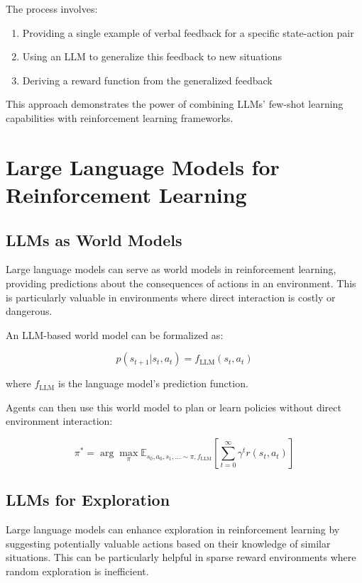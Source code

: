 \documentclass{article}
\begin{document}
The process involves:
\begin{enumerate}
    \item Providing a single example of verbal feedback for a specific state-action pair
    \item Using an LLM to generalize this feedback to new situations
    \item Deriving a reward function from the generalized feedback
\end{enumerate}

This approach demonstrates the power of combining LLMs' few-shot learning capabilities with reinforcement learning frameworks.

\section{Large Language Models for Reinforcement Learning}

\subsection{LLMs as World Models}

Large language models can serve as world models in reinforcement learning, providing predictions about the consequences of actions in an environment. This is particularly valuable in environments where direct interaction is costly or dangerous.

An LLM-based world model can be formalized as:

\begin{equation}
p(s_{t+1} | s_t, a_t) = f_{\text{LLM}}(s_t, a_t)
\end{equation}

where $f_{\text{LLM}}$ is the language model's prediction function.

Agents can then use this world model to plan or learn policies without direct environment interaction:

\begin{equation}
\pi^* = \arg\max_\pi \mathbb{E}_{s_0, a_0, s_1, \ldots \sim \pi, f_{\text{LLM}}}\left[\sum_{t=0}^{\infty} \gamma^t r(s_t, a_t)\right]
\end{equation}

\subsection{LLMs for Exploration}

Large language models can enhance exploration in reinforcement learning by suggesting potentially valuable actions based on their knowledge of similar situations. This can be particularly helpful in sparse reward environments where random exploration is inefficient.
\end{document}
